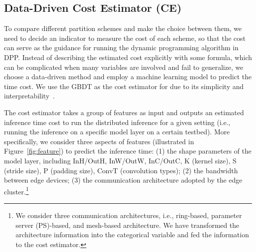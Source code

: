 
\subsection{Data-Driven Cost Estimator (CE)}
\label{sec:gdbt-estimator}






To compare different partition schemes and make the choice between them, we need to decide an indicator to measure the cost of each scheme, so that the cost can serve as the guidance for running the dynamic programming algorithm in DPP. Instead of describing the estimated cost explicitly with some formula, which can be complicated when many variables are involved and fail to generalize, we choose a data-driven method and employ a machine learning model to predict the time cost. We use the GBDT as the cost estimator for \sysname due to its simplicity and interpretability~\cite{chen2016xgboost}. 

The cost estimator takes a group of features as input and outputs an estimated inference time cost to run the distributed inference for a given setting (i.e., running the inference on a specific model layer on a certain testbed). More specifically, we consider three aspects of features (illustrated in Figure~\ref{fig:feature}) to predict the inference time: (1) the shape parameters of the model layer, including InH/OutH, InW/OutW, InC/OutC, K (kernel size), S (stride size), P (padding size),  ConvT (convolution types); (2) the bandwidth between edge devices; (3) the communication architecture adopted by the edge cluster.\footnote{We consider three communication architectures, i.e., ring-based, parameter server (PS)-based, and mesh-based architecture. We have transformed the architecture information into the categorical variable and fed the information to the cost estimator.}

